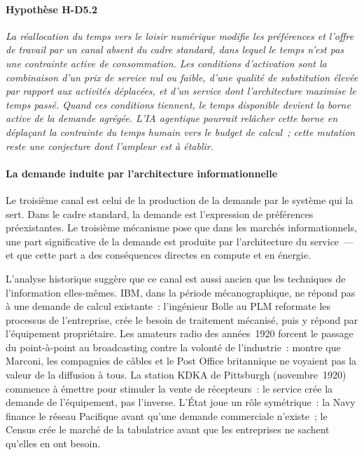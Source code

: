 \paragraph{Hypothèse H-D5.2} \emph{La réallocation du temps vers le loisir numérique modifie les préférences et l'offre de travail par un canal absent du cadre standard, dans lequel le temps n'est pas une contrainte active de consommation. Les conditions d'activation sont la combinaison d'un prix de service nul ou faible, d'une qualité de substitution élevée par rapport aux activités déplacées, et d'un service dont l'architecture maximise le temps passé. Quand ces conditions tiennent, le temps disponible devient la borne active de la demande agrégée. L'IA agentique pourrait relâcher cette borne en déplaçant la contrainte du temps humain vers le budget de calcul~; cette mutation reste une conjecture dont l'ampleur est à établir.}


\paragraph{La demande induite par l'architecture informationnelle}

\markEVO \markINST

Le troisième canal est celui de la production de la demande par le système qui la sert. Dans le cadre standard, la demande est l'expression de préférences préexistantes. Le troisième mécanisme pose que dans les marchés informationnels, une part significative de la demande est produite par l'architecture du service~--- et que cette part a des conséquences directes en compute et en énergie.

L'analyse historique suggère que ce canal est aussi ancien que les techniques de l'information elles-mêmes. IBM, dans la période mécanographique, ne répond pas à une demande de calcul existante~: l'ingénieur Bolle au PLM reformate les processus de l'entreprise, crée le besoin de traitement mécanisé, puis y répond par l'équipement propriétaire. Les amateurs radio des années~1920 forcent le passage du point-à-point au broadcasting contre la volonté de l'industrie~: \textcite{douglas_inventing_1987} montre que Marconi, les compagnies de câbles et le Post Office britannique ne voyaient pas la valeur de la diffusion à tous. La station KDKA de Pittsburgh (novembre~1920) commence à émettre pour stimuler la vente de récepteurs~: le service crée la demande de l'équipement, pas l'inverse. L'État joue un rôle symétrique~: la Navy finance le réseau Pacifique avant qu'une demande commerciale n'existe~; le Census crée le marché de la tabulatrice avant que les entreprises ne sachent qu'elles en ont besoin.

